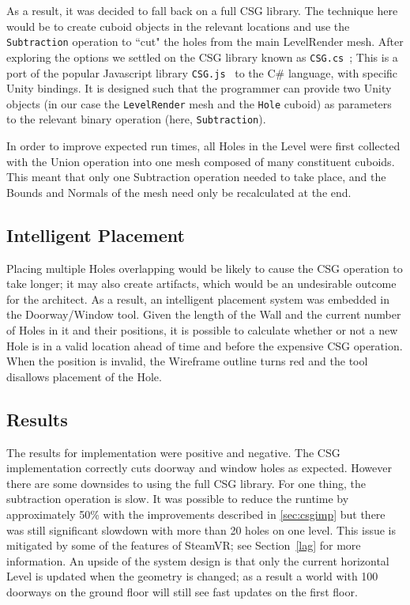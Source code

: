 As a result, it was decided to fall back on a full CSG library. The technique here would be to create cuboid objects in the relevant locations and use the \verb|Subtraction| operation to ``cut" the holes from the main LevelRender mesh. After exploring the options we settled on the CSG library known as \verb|CSG.cs|~\cite{csgcs}; This is a port of the popular Javascript library \verb|CSG.js|~\cite{csgjs} to the C\# language, with specific Unity bindings. It is designed such that the programmer can provide two Unity objects (in our case the \verb|LevelRender| mesh and the \verb|Hole| cuboid) as parameters to the relevant binary operation (here, \verb|Subtraction|).

In order to improve expected run times, all Holes in the Level were first collected with the Union operation into one mesh composed of many constituent cuboids. This meant that only one Subtraction operation needed to take place, and the Bounds and Normals of the mesh need only be recalculated at the end. 

\subsection{Intelligent Placement}

Placing multiple Holes overlapping would be likely to cause the CSG operation to take longer; it may also create artifacts, which would be an undesirable outcome for the architect. As a result, an intelligent placement system was embedded in the Doorway/Window tool. Given the length of the Wall and the current number of Holes in it and their positions, it is possible to calculate whether or not a new Hole is in a valid location ahead of time and before the expensive CSG operation. When the position is invalid, the Wireframe outline turns red and the tool disallows placement of the Hole.

\subsection{Results}

The results for implementation were positive and negative. The CSG implementation correctly cuts doorway and window holes as expected. However there are some downsides to using the full CSG library. For one thing, the subtraction operation is slow. It was possible to reduce the runtime by approximately 50\% with the improvements described in \ref{sec:csgimp} but there was still significant slowdown with more than 20 holes on one level. This issue is mitigated by some of the features of SteamVR; see Section~\ref{lag} for more information. An upside of the system design is that only the current horizontal Level is updated when the geometry is changed; as a result a world with 100 doorways on the ground floor will still see fast updates on the first floor.

